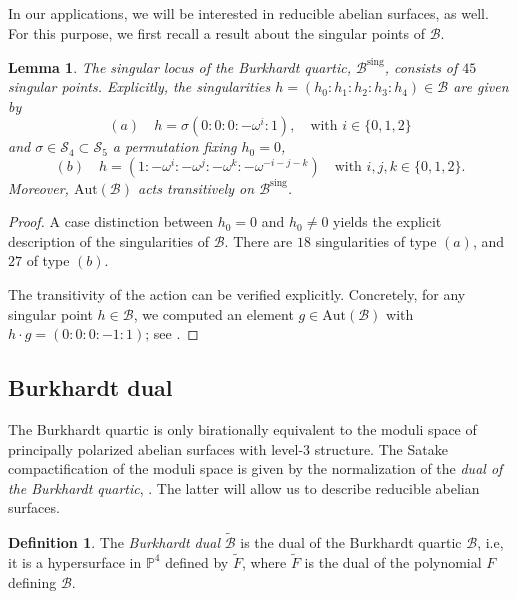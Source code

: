 \documentclass[11pt]{amsart}
\newtheorem{lemma}[theorem]{Lemma}
\theoremstyle{definition}
\newtheorem{definition}[theorem]{Definition}
\newcommand{\B}{\mathcal{B}}
\newcommand{\Bs}{\mathcal{B}^{\text{sing}}}
\newcommand{\Aut}{\text{Aut}}
\newcommand{\PP}{\mathbb{P}}
\begin{document}
In our applications, we will be interested in reducible abelian surfaces, as well. For this purpose, we first recall a result about the singular points of $\B$. 

\begin{lemma} \label{lem:singularities-burkhardt}
	The singular locus of the Burkhardt quartic, $\Bs$, consists of  $45$ singular points. Explicitly, the singularities $h = (h_0:h_1:h_2:h_3:h_4) \in \B$ are given by
	\[
	(a) \quad h = \sigma (0: 0: 0: -\omega^i:1), \quad \text{with } i \in \{0,1,2\}
	\]
	and $\sigma \in \mathcal S_4 \subset \mathcal S_5$ a permutation fixing $h_0= 0$,
	\[
	(b) \quad h = (1 : -\omega^i : - \omega^j : -\omega^k : -\omega^{-i-j-k}) \quad \text{with } i,j,k \in \{0,1,2\}. 
	\]
	Moreover, $\Aut(\B)$ acts transitively on $\Bs$. 
\end{lemma}

\begin{proof}
	A case distinction between $h_0 = 0$ and $h_0 \neq 0$ yields the explicit description of the singularities of $\B$. There are $18$ singularities  of type $(a)$, and $27$ of type $(b)$. 
	
	The transitivity of the action can be verified explicitly. Concretely, for any singular point $h \in \B$, we computed an element $g \in \Aut(\B)$ with $h\cdot g = (0:0:0:-1:1)$; see \cite{source_code}.
\end{proof}

\subsection{Burkhardt dual}\label{subsec:burkhardt-dual} The  Burkhardt quartic is only birationally equivalent to the moduli space of principally polarized abelian surfaces with level-$3$ structure. The Satake compactification of the moduli space is given by the normalization of the {\em dual of the Burkhardt quartic}, \cite{freitag2004burkhardt1}. The latter will allow us to describe reducible abelian surfaces.

\begin{definition}
	The {\em Burkhardt dual} $\tilde{\B}$ is the dual of the Burkhardt quartic $\B$, i.e, it is a hypersurface in $\PP^4$ defined by $\tilde{F}$, where $\tilde{F}$ is the dual of the polynomial $F$ defining ${\B}$.
\end{definition}
\end{document}
